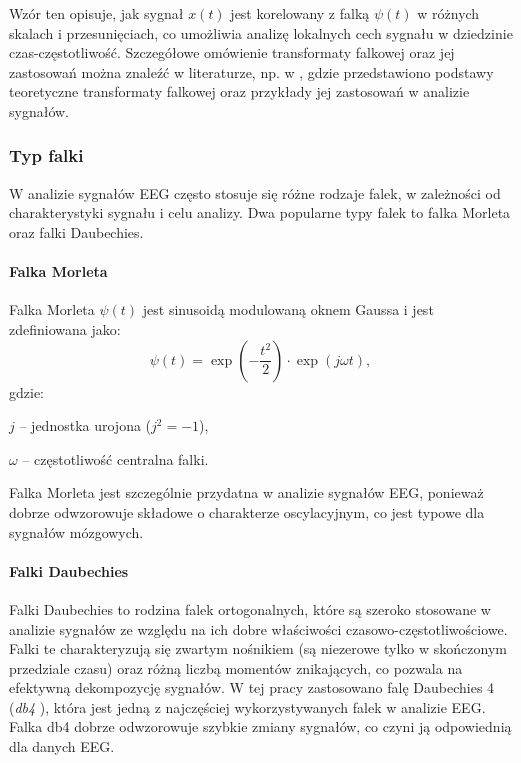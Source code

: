 \documentclass[eeg_v4.tex]{subfiles}
\begin{document}
    Wzór ten opisuje, jak sygnał \( x(t) \) jest korelowany z falką \( \psi(t) \)
    w różnych skalach i przesunięciach, co umożliwia analizę lokalnych cech sygnału w dziedzinie czas-częstotliwość.
    Szczegółowe omówienie transformaty falkowej oraz jej zastosowań można znaleźć w literaturze, np. w
    \cite{bibliotekanauki}
    , gdzie przedstawiono podstawy teoretyczne transformaty falkowej oraz przykłady jej zastosowań w analizie sygnałów.

    \subsubsection{Typ falki}

    W analizie sygnałów EEG często stosuje się różne rodzaje falek, w zależności od charakterystyki sygnału i celu
    analizy. Dwa popularne typy falek to falka Morleta oraz falki Daubechies.

    \paragraph{Falka Morleta}
    Falka Morleta \( \psi(t) \) jest sinusoidą modulowaną oknem Gaussa i jest zdefiniowana jako:
    \[
        \psi(t) = \exp\left(-\frac{t^2}{2}\right) \cdot \exp(j\omega t),
    \]
    gdzie:
    \begin{description}
        \item \( j \) – jednostka urojona (\( j^2 = -1 \)),
        \item \( \omega \) – częstotliwość centralna falki.
    \end{description}
    Falka Morleta jest szczególnie przydatna w analizie sygnałów EEG, ponieważ dobrze odwzorowuje składowe o charakterze
    oscylacyjnym, co jest typowe dla sygnałów mózgowych.

    \paragraph{Falki Daubechies}
    Falki Daubechies to rodzina falek ortogonalnych, które są szeroko stosowane w analizie sygnałów ze względu na ich
    dobre właściwości czasowo-częstotliwościowe. Falki te charakteryzują się zwartym nośnikiem (są niezerowe tylko w
    skończonym przedziale czasu) oraz różną liczbą momentów znikających, co pozwala na efektywną dekompozycję sygnałów.
    W tej pracy zastosowano falę Daubechies 4 (\textit{db4}
    ), która jest jedną z najczęściej wykorzystywanych falek w analizie EEG. Falka db4 dobrze odwzorowuje szybkie zmiany
    sygnałów, co czyni ją odpowiednią dla danych EEG.
\end{document}
